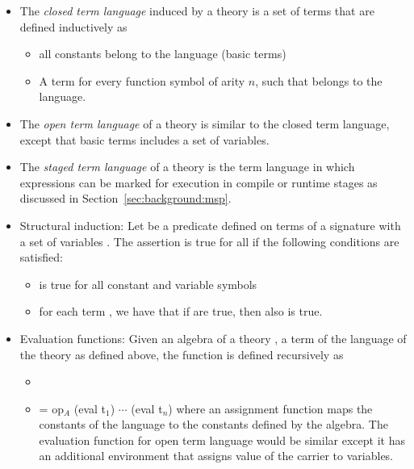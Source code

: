 \begin{itemize}
    \item The \emph{closed term language} induced by a theory is a set of terms that are defined inductively as 
    \begin{itemize}
        \item all constants belong to the language (basic terms) 
        \item A term  for every function symbol  of arity $n$, such that   belongs to the language. 
    \end{itemize}
    \item The \emph{open term language} of a theory is similar to the closed term language, except that basic terms includes a set of variables.  
    \item The \emph{staged term language} of a theory is the term language in which expressions can be marked for execution in compile or runtime stages as discussed in Section~\ref{sec:background:msp}.  
    \item Structural induction: Let  be a predicate defined on terms  of a signature  with a set of variables . The assertion  is true for all  if the following conditions are satisfied: 
    \begin{itemize}
        \item {} is true for all constant and variable symbols 
        \item for each term , we have that if  are true, then also  is true.  
    \end{itemize}     
    \item Evaluation functions: Given an algebra  of a theory \lstmath{$\Gamma = (\sort,\fsyms,\equations$)}, a term of the language of the theory as defined above, the function  is defined recursively as 
    \begin{itemize}
        \item {}
        \item {} = op$_A$ (eval t$_1$) $\cdots$ (eval t$_n$) where an assignment function maps the constants of the language to the constants defined by the algebra. The evaluation function for open term language would be similar except it has an additional environment that assigns value of the carrier to variables. 

\end{itemize}
\end{itemize}

